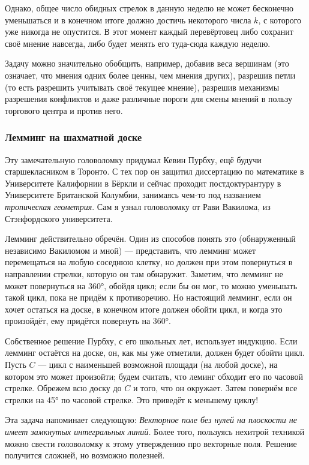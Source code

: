 Однако, общее число обидных стрелок в данную неделю не может бесконечно уменьшаться и в конечном итоге должно достичь некоторого числа $k$, с которого уже никогда не опустится.
В этот момент каждый перевёртовец либо сохранит своё мнение навсегда, либо будет менять его туда-сюда каждую неделю.

\medskip

Задачу можно значительно обобщить, например, добавив веса вершинам (это означает, что мнения одних более ценны, чем мнения других), разрешив петли (то есть разрешить учитывать своё текущее мнение), разрешив механизмы разрешения конфликтов и даже различные пороги для смены мнений в пользу торгового центра и против него.

\subsubsection*{Лемминг на шахматной доске}

Эту замечательную головоломку придумал Кевин Пурбху, ещё будучи старшекласником в Торонто.
С тех пор он защитил диссертацию по математике в Университете Калифорнии в Бёркли и
сейчас проходит постдоктурантуру в Университете Британской Колумбии,
занимаясь чем-то под названием \emph{тропическая геометрия}.
Сам я узнал головоломку от Рави Вакилома, из Стэнфордского университета.

Лемминг действительно обречён.
Один из способов понять это (обнаруженный независимо Вакиломом и мной) --- представить, что лемминг может перемещаться на любую соседнюю клетку, но должен при этом повернуться в направлении стрелки, которую он там обнаружит.
Заметим, что лемминг не может повернуться на 360°, обойдя цикл;
если бы он мог, то можно уменьшать такой цикл, пока не придём к противоречию.
Но настоящий лемминг, если он хочет остаться на доске, в конечном итоге должен обойти цикл, и когда это произойдёт, ему придётся повернуть на 360°.

Собственное решение Пурбху, с его школьных лет, использует индукцию.
Если лемминг остаётся на доске, он, как мы уже отметили, должен будет обойти цикл.
Пусть $C$ --- цикл с наименьшей возможной площади (на любой доске), на котором это может произойти; будем считать, что леминг обходит его по часовой стрелке.
Обрежем всю доску до $C$ и того, что он окружает.
Затем повернём все стрелки на 45° по часовой стрелке.
Это приведёт к меньшему циклу!

\begin{addedbytheeditors}
Эта задача напоминает следующую: \emph{Векторное поле без нулей на плоскости не имеет замкнутых интегральных линий.}
Более того, пользуясь нехитрой техникой можно свести головоломку к этому утверждению про векторные поля.
Решение получится сложней, но возможно полезней.
\end{addedbytheeditors}
